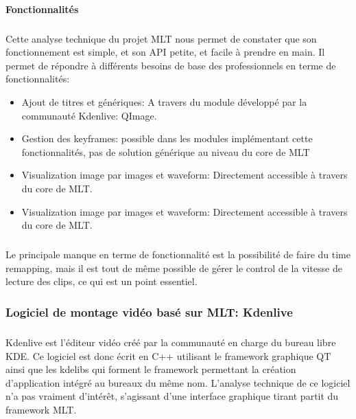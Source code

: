 \paragraph{Fonctionnalités}

\subparagraph{ }

Cette analyse technique du projet MLT nous permet de constater que
son fonctionnement est simple, et son API petite, et facile à prendre
en main.  Il permet de répondre à différents besoins de base  des
professionnels en terme de fonctionnalités:

\begin{itemize}

  \item {Ajout de titres et génériques: A travers du module développé
  par la
    communauté Kdenlive: QImage.}

  \item {Gestion des keyframes: possible dans les modules implémentant
    cette fonctionnalités, pas de solution générique au niveau du
    core de MLT}

  \item {Visualization image par images et waveform: Directement
  accessible à
    travers du core de MLT.}

  \item {Visualization image par images et waveform: Directement
  accessible à
    travers du core de MLT.}

\end{itemize}

\subparagraph{}

Le principale manque en terme de fonctionnalité est la possibilité de
faire du time remapping, mais il est tout de même possible de gérer le
control de la vitesse de lecture des clips, ce qui est un point essentiel.

\subsubsection {Logiciel de montage vidéo basé sur MLT: Kdenlive}

\subparagraph{}

Kdenlive est l'éditeur vidéo créé par la communauté en charge
du bureau libre KDE. Ce logiciel est donc écrit en C++ utilisant le
framework graphique QT  ainsi que les kdelibs qui forment le framework
permettant la création d'application intégré au bureaux du même nom.
L'analyse technique de ce logiciel n'a pas vraiment d'intérêt,
s'agissant d'une interface graphique tirant partit du framework MLT.

